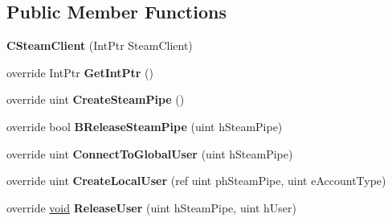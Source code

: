 \subsection*{Public Member Functions}
\begin{DoxyCompactItemize}
\item 
\hypertarget{classValve_1_1Steamworks_1_1CSteamClient_af4b173016259cfbb19be79cca8c6faac}{}{\bfseries C\+Steam\+Client} (Int\+Ptr Steam\+Client)\label{classValve_1_1Steamworks_1_1CSteamClient_af4b173016259cfbb19be79cca8c6faac}

\item 
\hypertarget{classValve_1_1Steamworks_1_1CSteamClient_a251252a843d8744b30be934854bd7672}{}override Int\+Ptr {\bfseries Get\+Int\+Ptr} ()\label{classValve_1_1Steamworks_1_1CSteamClient_a251252a843d8744b30be934854bd7672}

\item 
\hypertarget{classValve_1_1Steamworks_1_1CSteamClient_a8466282b9748692b2889884b649b1023}{}override uint {\bfseries Create\+Steam\+Pipe} ()\label{classValve_1_1Steamworks_1_1CSteamClient_a8466282b9748692b2889884b649b1023}

\item 
\hypertarget{classValve_1_1Steamworks_1_1CSteamClient_ae296769214255c0f85580bc68b0c1c11}{}override bool {\bfseries B\+Release\+Steam\+Pipe} (uint h\+Steam\+Pipe)\label{classValve_1_1Steamworks_1_1CSteamClient_ae296769214255c0f85580bc68b0c1c11}

\item 
\hypertarget{classValve_1_1Steamworks_1_1CSteamClient_a792c4e32c0b656255abce6ae74efc448}{}override uint {\bfseries Connect\+To\+Global\+User} (uint h\+Steam\+Pipe)\label{classValve_1_1Steamworks_1_1CSteamClient_a792c4e32c0b656255abce6ae74efc448}

\item 
\hypertarget{classValve_1_1Steamworks_1_1CSteamClient_afb8a9e7a7917f1ebe6fb4b4fbe4a89bf}{}override uint {\bfseries Create\+Local\+User} (ref uint ph\+Steam\+Pipe, uint e\+Account\+Type)\label{classValve_1_1Steamworks_1_1CSteamClient_afb8a9e7a7917f1ebe6fb4b4fbe4a89bf}

\item 
\hypertarget{classValve_1_1Steamworks_1_1CSteamClient_ab0b0d08fbcd6e60ecddc0f6768019aba}{}override \hyperlink{SDL__audio_8h_a52835ae37c4bb905b903cbaf5d04b05f}{void} {\bfseries Release\+User} (uint h\+Steam\+Pipe, uint h\+User)\label{classValve_1_1Steamworks_1_1CSteamClient_ab0b0d08fbcd6e60ecddc0f6768019aba}


\end{DoxyCompactItemize}
